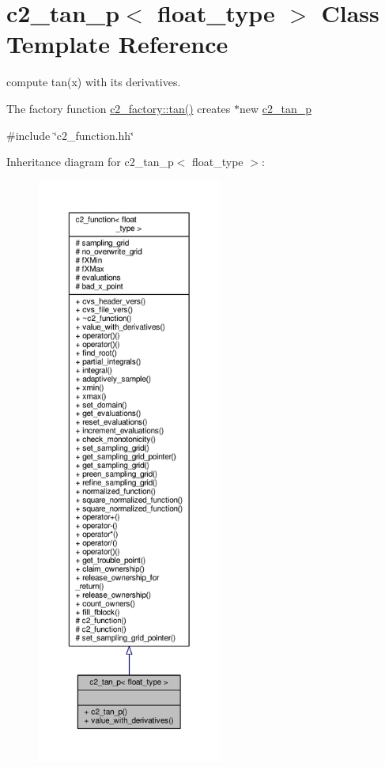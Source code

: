 \hypertarget{classc2__tan__p}{}\section{c2\+\_\+tan\+\_\+p$<$ float\+\_\+type $>$ Class Template Reference}
\label{classc2__tan__p}


compute tan(x) with its derivatives.

The factory function \hyperlink{classc2__factory_a2f83cbd3be646166f7e3bef1e27244b9}{c2\+\_\+factory\+::tan()} creates $\ast$new \hyperlink{classc2__tan__p}{c2\+\_\+tan\+\_\+p}  




{\ttfamily \#include \char`\"{}c2\+\_\+function.\+hh\char`\"{}}



Inheritance diagram for c2\+\_\+tan\+\_\+p$<$ float\+\_\+type $>$\+:
\nopagebreak
\begin{figure}[H]
\begin{center}
\leavevmode
\includegraphics[height=550pt]{classc2__tan__p__inherit__graph}
\end{center}
\end{figure}


